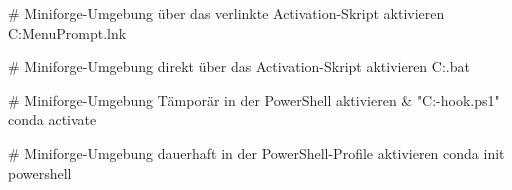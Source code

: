 # Miniforge-Umgebung über das verlinkte Activation-Skript aktivieren
C:\Users\Benutzer\AppData\Roaming\Microsoft\Windows\Start Menu\Programs{}\Miniforge Prompt.lnk

# Miniforge-Umgebung direkt über das Activation-Skript aktivieren
C:\Users\tomak{}\Scripts\activate.bat

# Miniforge-Umgebung Tämporär in der PowerShell aktivieren
& "C:\Users\tomak{}\shell\condabin\conda-hook.ps1"
conda activate

# Miniforge-Umgebung dauerhaft in der PowerShell-Profile aktivieren
conda init powershell